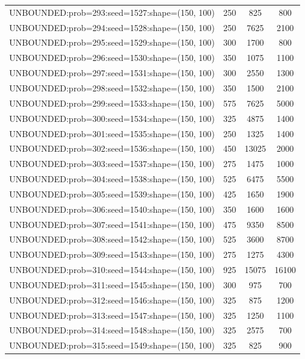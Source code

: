 \begin{longtable}{lccc}
UNBOUNDED:prob=293:seed=1527:shape=(150, 100) &      250 &   825 &    800 \\
UNBOUNDED:prob=294:seed=1528:shape=(150, 100) &      250 &  7625 &   2100 \\
UNBOUNDED:prob=295:seed=1529:shape=(150, 100) &      300 &  1700 &    800 \\
UNBOUNDED:prob=296:seed=1530:shape=(150, 100) &      350 &  1075 &   1100 \\
UNBOUNDED:prob=297:seed=1531:shape=(150, 100) &      300 &  2550 &   1300 \\
UNBOUNDED:prob=298:seed=1532:shape=(150, 100) &      350 &  1500 &   2100 \\
UNBOUNDED:prob=299:seed=1533:shape=(150, 100) &      575 &  7625 &   5000 \\
UNBOUNDED:prob=300:seed=1534:shape=(150, 100) &      325 &  4875 &   1400 \\
UNBOUNDED:prob=301:seed=1535:shape=(150, 100) &      250 &  1325 &   1400 \\
UNBOUNDED:prob=302:seed=1536:shape=(150, 100) &      450 & 13025 &   2000 \\
UNBOUNDED:prob=303:seed=1537:shape=(150, 100) &      275 &  1475 &   1000 \\
UNBOUNDED:prob=304:seed=1538:shape=(150, 100) &      525 &  6475 &   5500 \\
UNBOUNDED:prob=305:seed=1539:shape=(150, 100) &      425 &  1650 &   1900 \\
UNBOUNDED:prob=306:seed=1540:shape=(150, 100) &      350 &  1600 &   1600 \\
UNBOUNDED:prob=307:seed=1541:shape=(150, 100) &      475 &  9350 &   8500 \\
UNBOUNDED:prob=308:seed=1542:shape=(150, 100) &      525 &  3600 &   8700 \\
UNBOUNDED:prob=309:seed=1543:shape=(150, 100) &      275 &  1275 &   4300 \\
UNBOUNDED:prob=310:seed=1544:shape=(150, 100) &      925 & 15075 &  16100 \\
UNBOUNDED:prob=311:seed=1545:shape=(150, 100) &      300 &   975 &    700 \\
UNBOUNDED:prob=312:seed=1546:shape=(150, 100) &      325 &   875 &   1200 \\
UNBOUNDED:prob=313:seed=1547:shape=(150, 100) &      325 &  1250 &   1100 \\
UNBOUNDED:prob=314:seed=1548:shape=(150, 100) &      325 &  2575 &    700 \\
UNBOUNDED:prob=315:seed=1549:shape=(150, 100) &      325 &   825 &    900 \\

\end{longtable}
